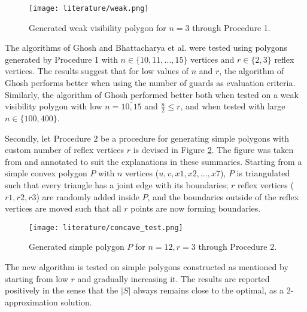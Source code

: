 \begin{figure}[h!]
    \centering
    \texttt{[image: literature/weak.png]}
    \caption{Generated weak visibility polygon for $n = 3$ \cite{maleki2022implementation} through Procedure 1.}
    \label{fig:weak}
\end{figure}

The algorithms of Ghosh \cite{GHOSH2010718} and Bhattacharya et al. \cite{bhattacharya2016approximability} were tested using polygons generated by Procedure 1 with $n \in \{10, 11, ..., 15\}$ vertices and $r \in \{2, 3\}$ reflex vertices. The results suggest that for low values of $n$ and $r$, the algorithm of Ghosh \cite{GHOSH2010718} performs better when using the number of guards as evaluation criteria. 
Similarly, the algorithm of Ghosh \cite{GHOSH2010718} performed better both when tested on a weak visibility polygon with low $n = \overline{10, 15}$ and $\frac n 2 \leq r$, and when tested with large $n \in \{100, 400\}$.

Secondly, let Procedure 2 be a procedure for generating simple polygons with custom number of reflex vertices $r$ is devised in Figure \ref{fig:arbitrary}. The figure was taken from \cite{maleki2022implementation} and annotated to suit the explanations in these summaries. Starting from a simple convex polygon $P$ with $n$ vertices ($u, v, x1, x2, ..., x7$), $P$ is triangulated such that every triangle has a joint edge with its boundaries; $r$ reflex vertices ($r1, r2, r3$) are randomly added inside $P$, and the boundaries outside of the reflex vertices are moved such that all $r$ points are now forming boundaries. 

\begin{figure}[h!]
    \centering
    \texttt{[image: literature/concave\_test.png]}
    \caption{Generated simple polygon $P$ for $n = 12, r = 3$ \cite{maleki2022implementation} through Procedure 2.}
    \label{fig:arbitrary}
\end{figure}

The new algorithm is tested on simple polygons constructed as mentioned by starting from low $r$ and gradually increasing it. The results are reported positively in the sense that the $|S|$ always remains close to the optimal, as a 2-approximation solution.

